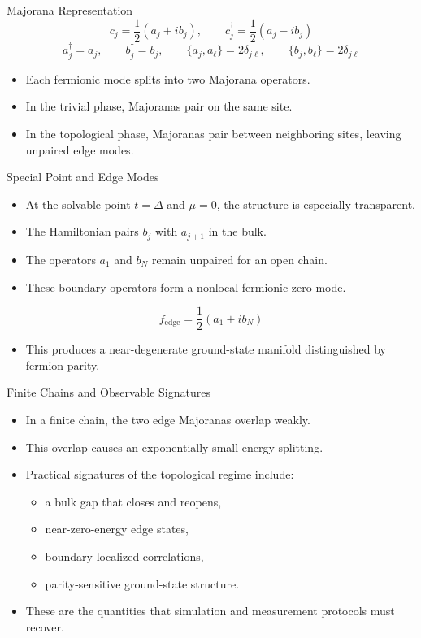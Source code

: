\documentclass[aspectratio=169]{beamer}
\begin{document}
\begin{frame}{Majorana Representation}
\[
c_j = \frac{1}{2}\left(a_j + i b_j\right),
\qquad
c_j^\dagger = \frac{1}{2}\left(a_j - i b_j\right)
\]
\[
a_j^\dagger = a_j,\qquad b_j^\dagger = b_j,\qquad
\{a_j,a_\ell\}=2\delta_{j\ell},\qquad
\{b_j,b_\ell\}=2\delta_{j\ell}
\]

\begin{itemize}
\item Each fermionic mode splits into two Majorana operators.
\item In the trivial phase, Majoranas pair on the same site.
\item In the topological phase, Majoranas pair between neighboring sites, leaving unpaired edge modes.
\end{itemize}
\end{frame}

\begin{frame}{Special Point and Edge Modes}
\begin{itemize}
\item At the solvable point \(t=\Delta\) and \(\mu=0\), the structure is especially transparent.
\item The Hamiltonian pairs \(b_j\) with \(a_{j+1}\) in the bulk.
\item The operators \(a_1\) and \(b_N\) remain unpaired for an open chain.
\item These boundary operators form a nonlocal fermionic zero mode.
\end{itemize}
\[
f_{\text{edge}} = \frac{1}{2}\left(a_1 + i b_N\right)
\]
\begin{itemize}
\item This produces a near-degenerate ground-state manifold distinguished by fermion parity.
\end{itemize}
\end{frame}

\begin{frame}{Finite Chains and Observable Signatures}
\begin{itemize}
\item In a finite chain, the two edge Majoranas overlap weakly.
\item This overlap causes an exponentially small energy splitting.
\item Practical signatures of the topological regime include:
\begin{itemize}
\item a bulk gap that closes and reopens,
\item near-zero-energy edge states,
\item boundary-localized correlations,
\item parity-sensitive ground-state structure.
\end{itemize}
\item These are the quantities that simulation and measurement protocols must recover.
\end{itemize}
\end{frame}
\end{document}
